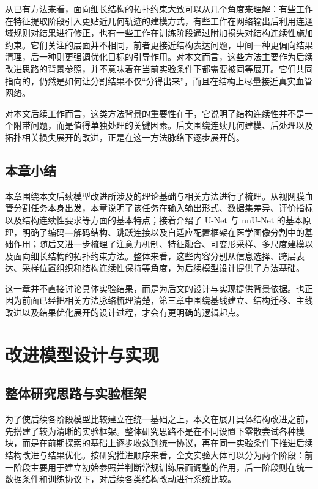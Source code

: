 \documentclass[a4paper,12pt]{article}
\begin{document}
从已有方法来看，面向细长结构的拓扑约束大致可以从几个角度来理解：有些工作在特征提取阶段引入更贴近几何轨迹的建模方式，有些工作在网络输出后利用连通域规则对结果进行修正，也有一些工作在训练阶段通过附加损失对结构连续性施加约束。它们关注的层面并不相同，前者更接近结构表达问题，中间一种更偏向结果清理，后一种则更强调优化目标的引导作用。对本文而言，这些方法主要作为后续改进思路的背景参照，并不意味着在当前实验条件下都需要被同等展开。它们共同指向的，仍然是如何让分割结果不仅“分得出来”，而且在结构上尽量接近真实血管网络。

对本文后续工作而言，这类方法背景的重要性在于，它说明了结构连续性并不是一个附带问题，而是值得单独处理的关键因素。后文围绕连续几何建模、后处理以及拓扑相关损失展开的改进，正是在这一方法脉络下逐步展开的。

\subsection{本章小结}
本章围绕本文后续模型改进所涉及的理论基础与相关方法进行了梳理。从视网膜血管分割任务本身出发，本章说明了该任务在输入输出形式、数据集差异、评价指标以及结构连续性要求等方面的基本特点；接着介绍了 U-Net 与 nnU-Net 的基本原理，明确了编码—解码结构、跳跃连接以及自适应配置框架在医学图像分割中的基础作用；随后又进一步梳理了注意力机制、特征融合、可变形采样、多尺度建模以及面向细长结构的拓扑约束方法。整体来看，这些内容分别从信息选择、跨层表达、采样位置组织和结构连续性保持等角度，为后续模型设计提供了方法基础。

这一章并不直接讨论具体实验结果，而是为后文的设计与实现提供背景依据。也正因为前面已经把相关方法脉络梳理清楚，第三章中围绕基线建立、结构迁移、主线改进以及结果优化展开的设计过程，才会有更明确的逻辑起点。

\section{改进模型设计与实现}

\subsection{整体研究思路与实验框架}
为了使后续各阶段模型比较建立在统一基础之上，本文在展开具体结构改进之前，先搭建了较为清晰的实验框架。整体研究思路不是在不同设置下零散尝试各种模块，而是在前期探索的基础上逐步收敛到统一协议，再在同一实验条件下推进后续结构改进与结果优化。按研究推进顺序来看，全文实验大体可以分为两个阶段：前一阶段主要用于建立初始参照并判断常规训练层面调整的作用，后一阶段则在统一数据条件和训练协议下，对后续各类结构改动进行系统比较。
\end{document}
